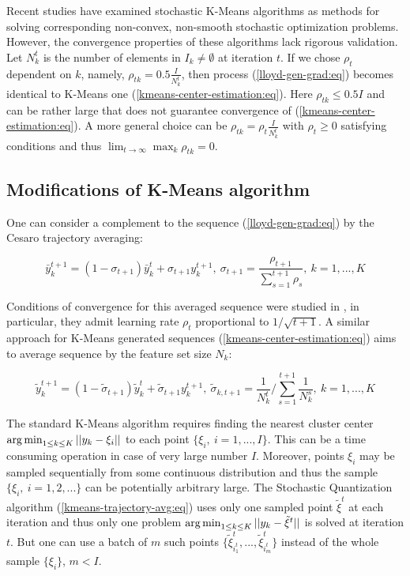 Recent studies \cite{Tang_2017,Zhao_Lan_Chen_Ngo_2021} have examined stochastic K-Means algorithms as methods for solving corresponding non-convex, non-smooth stochastic optimization problems. However, the convergence properties of these algorithms lack rigorous validation. Let $ N_k^t $ is the number of elements in $ I_k \neq \emptyset $ at iteration $ t $. If we chose $ \rho_t $ dependent on $ k $, namely, $ \rho_{tk} = 0.5 \frac{I}{N_k^t} $, then process (\ref{lloyd-gen-grad:eq}) becomes identical to K-Means one (\ref{kmeans-center-estimation:eq}). Here $ \rho_{tk} \leq 0.5 I $ and can be rather large that does not guarantee convergence of (\ref{kmeans-center-estimation:eq}). A more general choice can be $ \rho_{tk} = \rho_t \frac{I}{N_k^t} $ with $ \rho_t \geq 0 $ satisfying conditions  and thus $ \lim_{t \to \infty} \max_k \rho_{tk} = 0 $.

\subsection{Modifications of K-Means algorithm}

One can consider a complement to the sequence (\ref{lloyd-gen-grad:eq}) by the Cesaro trajectory averaging:

\begin{equation}
    \label{kmeans-trajectory-avg:eq}
        \bar{y}_k^{t+1} = (1 - \sigma_{t+1}) \bar{y}_k^{t} + \sigma_{t+1} y_k^{t+1}, \> \sigma_{t+1} = \frac{\rho_{t+1}}{\sum_{s=1}^{t+1} \rho_{s}}, \> k = 1, ..., K
\end{equation}

Conditions of convergence for this averaged sequence were studied in \cite{mikhalevich2024}, in particular, they admit learning rate $ \rho_t $ proportional to $ 1 / \sqrt{t+1} $. A similar approach for K-Means generated sequences (\ref{kmeans-center-estimation:eq}) aims to average sequence by the feature set size $ N_k $:

\begin{equation}
    \label{kmeans-trajectory-avg-alt:eq}
        \tilde{y}_k^{t+1} = (1 - \tilde{\sigma}_{t+1}) \tilde{y}_k^{t} + \tilde{\sigma}_{t+1} y_k^{t+1}, \> \tilde{\sigma}_{k, t+1} = \frac{1}{N_k^t} / \sum_{s=1}^{t+1} \frac{1}{N_k^s}, \> k = 1, ..., K
\end{equation}

The standard K-Means algorithm requires finding the nearest cluster center $ \operatorname*{arg\,min}_{1 \leq k \leq K} || y_k - \xi_i || $ to each point $ \{ \xi_i, \> i = 1, ..., I \} $. This can be a time consuming operation in case of very large number $ I $. Moreover, points $ \xi_i $ may be sampled sequentially from some continuous distribution and thus the sample $ \{ \xi_i, \> i = 1, 2, ... \} $ can be potentially arbitrary large. The Stochastic Quantization algorithm (\ref{kmeans-trajectory-avg:eq}) uses only one sampled point $ \tilde{\xi}^t $ at each iteration and thus only one problem $ \operatorname*{arg\,min}_{1 \leq k \leq K} || y_k - \tilde{\xi}^t || $ is solved at iteration $ t $. But one can use a batch of $ m $ such points $ \{ \tilde{\xi}^t_{i_1^t}, ..., \tilde{\xi}^t_{i_m^t} \} $ instead of the whole sample $ \{ \xi_i \} $, $ m < I $. 
